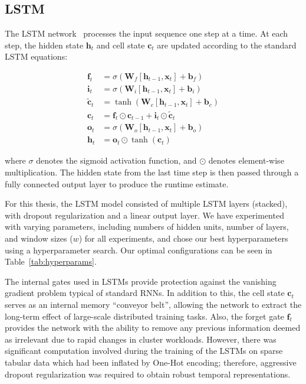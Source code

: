 \clearpage

\subsection{LSTM}

The LSTM network~\cite{hochreiter1997long} processes the input sequence one step at a time. At each step, the hidden state $\mathbf{h}_t$ and cell state $\mathbf{c}_t$ are updated according to the standard LSTM equations:

\begin{align}
    \mathbf{f}_t &= \sigma(\mathbf{W}_f [\mathbf{h}_{t-1}, \mathbf{x}_t] + \mathbf{b}_f) \\ 
    \mathbf{i}_t &= \sigma(\mathbf{W}_i [\mathbf{h}_{t-1}, \mathbf{x}_t] + \mathbf{b}_i) \\ 
    \tilde{\mathbf{c}}_t &= \tanh(\mathbf{W}_c [\mathbf{h}_{t-1}, \mathbf{x}_t] + \mathbf{b}_c) \\ 
    \mathbf{c}_t &= \mathbf{f}_t \odot \mathbf{c}_{t-1} + \mathbf{i}_t \odot \tilde{\mathbf{c}}_t \\ 
    \mathbf{o}_t &= \sigma(\mathbf{W}_o [\mathbf{h}_{t-1}, \mathbf{x}_t] + \mathbf{b}_o) \\ 
    \mathbf{h}_t &= \mathbf{o}_t \odot \tanh(\mathbf{c}_t)
\end{align}

where $\sigma$ denotes the sigmoid activation function, and $\odot$ denotes element-wise multiplication. The hidden state from the last time step is then passed through a fully connected output layer to produce the runtime estimate.

For this thesis, the LSTM model consisted of multiple LSTM layers (stacked), with dropout regularization and a linear output layer. We have experimented with varying parameters, including numbers of hidden units, number of layers, and window sizes ($w$) for all experiments, and chose our best hyperparameters using a hyperparameter search. Our optimal configurations can be seen in Table~\ref{tab:hyperparams}.

The internal gates used in LSTMs provide protection against the vanishing gradient problem typical of standard RNNs. In addition to this, the cell state $\mathbf{c}_t$ serves as an internal memory ``conveyor belt'', allowing the network to extract the long-term effect of large-scale distributed training tasks. Also, the forget gate $\mathbf{f}_t$ provides the network with the ability to remove any previous information deemed as irrelevant due to rapid changes in cluster workloads. However, there was significant computation involved during the training of the LSTMs on sparse tabular data which had been inflated by One-Hot encoding; therefore, aggressive dropout regularization was required to obtain robust temporal representations.

